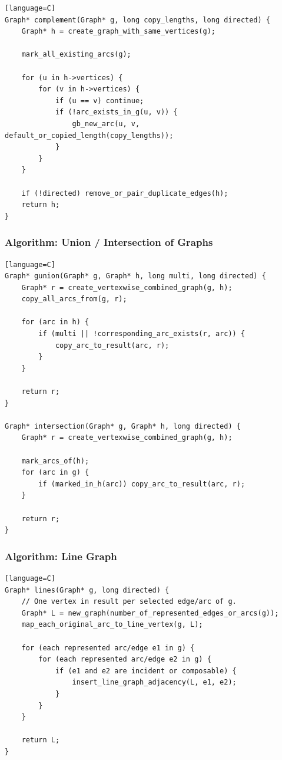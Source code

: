 \documentclass[11pt]{article}
\begin{document}
\begin{verbatim}[language=C]
Graph* complement(Graph* g, long copy_lengths, long directed) {
    Graph* h = create_graph_with_same_vertices(g);

    mark_all_existing_arcs(g);

    for (u in h->vertices) {
        for (v in h->vertices) {
            if (u == v) continue;
            if (!arc_exists_in_g(u, v)) {
                gb_new_arc(u, v, default_or_copied_length(copy_lengths));
            }
        }
    }

    if (!directed) remove_or_pair_duplicate_edges(h);
    return h;
}
\end{verbatim}

\subsubsection{Algorithm: Union / Intersection of Graphs}\label{algorithm-union-intersection-of-graphs}

\begin{verbatim}[language=C]
Graph* gunion(Graph* g, Graph* h, long multi, long directed) {
    Graph* r = create_vertexwise_combined_graph(g, h);
    copy_all_arcs_from(g, r);

    for (arc in h) {
        if (multi || !corresponding_arc_exists(r, arc)) {
            copy_arc_to_result(arc, r);
        }
    }

    return r;
}

Graph* intersection(Graph* g, Graph* h, long directed) {
    Graph* r = create_vertexwise_combined_graph(g, h);

    mark_arcs_of(h);
    for (arc in g) {
        if (marked_in_h(arc)) copy_arc_to_result(arc, r);
    }

    return r;
}
\end{verbatim}

\subsubsection{Algorithm: Line Graph}\label{algorithm-line-graph}

\begin{verbatim}[language=C]
Graph* lines(Graph* g, long directed) {
    // One vertex in result per selected edge/arc of g.
    Graph* L = new_graph(number_of_represented_edges_or_arcs(g));
    map_each_original_arc_to_line_vertex(g, L);

    for (each represented arc/edge e1 in g) {
        for (each represented arc/edge e2 in g) {
            if (e1 and e2 are incident or composable) {
                insert_line_graph_adjacency(L, e1, e2);
            }
        }
    }

    return L;
}
\end{verbatim}
\end{document}

